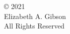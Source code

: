 
\thispagestyle{empty} %
\setcounter{page}{0} %
\null\vfill %
\begin{center}
  \SingleSpace %
\copyright \hspace{1mm} 2021\\
Elizabeth A. Gibson\\
All Rights Reserved\\
\end{center}
